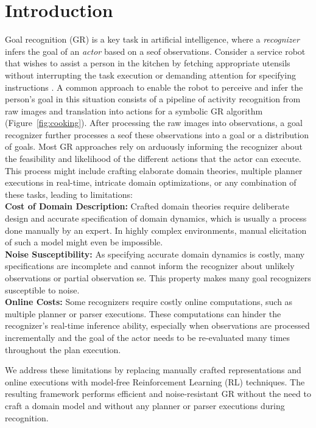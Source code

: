 \documentclass[letterpaper]{article}
\begin{document}
\section*{Introduction}
\label{sec:intro}
Goal recognition (GR) is a key task in artificial intelligence, where a \textit{recognizer} infers the goal of an \textit{actor} based on a seof observations.
Consider a service robot that wishes to assist a person in the kitchen by fetching appropriate utensils without interrupting the task execution or demanding attention for specifying instructions \cite{kautz1986generalized,Monteiro2017,granada2020object,bishop2020chaopt}.
A common approach to enable the robot to perceive and infer the person's goal in this situation consists of a pipeline of activity recognition from raw images and translation into actions for a symbolic GR algorithm (Figure~\ref{fig:cooking}).
After processing the raw images into observations, a goal recognizer further processes a seof these observations into a goal or a distribution of goals.
Most GR approaches rely on arduously informing the recognizer about the feasibility and likelihood of the different actions that the actor can execute.
This process might include crafting elaborate domain theories, multiple planner executions in real-time, intricate domain optimizations, or any combination of these tasks, leading to limitations:\\
%
%
%
%
%
%
%
%
\textbf{Cost of Domain Description:} Crafted domain theories require deliberate design and accurate specification of domain dynamics, which is usually a process done manually by an expert.
In highly complex environments, manual elicitation of such a model might even be impossible.\\
\textbf{Noise Susceptibility:} As specifying accurate domain dynamics is costly, many specifications are incomplete and cannot inform the recognizer about unlikely observations or partial observation se.
This property makes many goal recognizers susceptible to noise. \\
\textbf{Online Costs:} Some recognizers require costly online computations, such as multiple planner or parser executions. These computations can hinder the recognizer's real-time inference ability, especially when observations are processed incrementally and the goal of the actor needs to be re-evaluated many times throughout the plan execution.

We address these limitations by replacing manually crafted representations and online executions with model-free Reinforcement Learning (RL) techniques.
The resulting framework performs efficient and noise-resistant GR without the need to craft a domain model and without any planner or parser executions during recognition.
\end{document}

